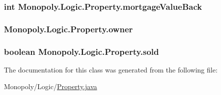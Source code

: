 \subsubsection[{\texorpdfstring{mortgage\+Value\+Back}{mortgageValueBack}}]{\setlength{\rightskip}{0pt plus 5cm}int Monopoly.\+Logic.\+Property.\+mortgage\+Value\+Back\hspace{0.3cm}{\ttfamily [protected]}}\hypertarget{class_monopoly_1_1_logic_1_1_property_a55c335444620ceab613d4e89c81e1eff}{}\label{class_monopoly_1_1_logic_1_1_property_a55c335444620ceab613d4e89c81e1eff}
\subsubsection[{\texorpdfstring{owner}{owner}}]{ Monopoly.\+Logic.\+Property.\+owner\hspace{0.3cm}{\ttfamily [protected]}}\hypertarget{class_monopoly_1_1_logic_1_1_property_a9f3128c7bd27dcebe1b58227124e87ff}{}\label{class_monopoly_1_1_logic_1_1_property_a9f3128c7bd27dcebe1b58227124e87ff}
\subsubsection[{\texorpdfstring{sold}{sold}}]{\setlength{\rightskip}{0pt plus 5cm}boolean Monopoly.\+Logic.\+Property.\+sold\hspace{0.3cm}{\ttfamily [protected]}}\hypertarget{class_monopoly_1_1_logic_1_1_property_a3a3b93ad91c78c5fc0ffd6f5bfbdad1b}{}\label{class_monopoly_1_1_logic_1_1_property_a3a3b93ad91c78c5fc0ffd6f5bfbdad1b}


The documentation for this class was generated from the following file\+:\begin{DoxyCompactItemize}
\item 
Monopoly/\+Logic/\hyperlink{_property_8java}{Property.\+java}\end{DoxyCompactItemize}
